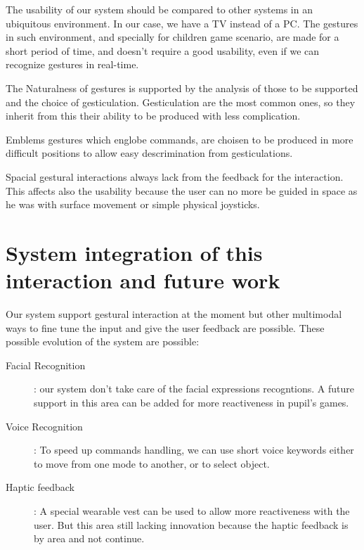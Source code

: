 \documentclass{llncs}
\newcommand\ignore[1]{}
\begin{document}
The usability of our system should be compared to other systems in an ubiquitous
environment. In our case, we have a TV instead of a PC.
The gestures in such environment, and specially for children game scenario,
are made for a short period of time, and doesn't require a good usability,
even if we can recognize gestures in real-time.

The Naturalness of gestures is supported by the analysis of those to be
supported and the choice of gesticulation.
Gesticulation are the most common ones, so they inherit from this their
ability to be produced with less complication.

Emblems gestures which englobe commands, are choisen to be produced in more
difficult positions to allow easy descrimination from gesticulations.

Spacial gestural interactions always lack from the feedback for the interaction.
This affects also the usability because the user can no more be guided in space
as he was with surface movement or simple physical joysticks.

\section{System integration of this interaction and future work}

Our system support gestural interaction at the moment but other multimodal ways
to fine tune the input and give the user feedback are possible.
These possible evolution of the system are possible:

\begin{description}
 \item[Facial Recognition]: our system don't take care of the facial expressions
recogntions. A future support in this area can be added for more reactiveness in
pupil's games.
 \item[Voice Recognition]: To speed up commands handling, we can use short voice
keywords either to move from one mode to another, or to select object.
 \item[Haptic feedback]: A special wearable vest can be used to allow more
reactiveness with the user. But this area still lacking innovation because the
haptic feedback is by area and not continue.
\end{description}

\ignore{
Gesture + facial recog.
Voice recognition
Haptic 
--
Naturalness came from the analysis of gestures used in talk shows.
(gestures used many times means nature gestures)
Reverse thinking.
Usability in the context of RevTV ??
}


\end{document}
